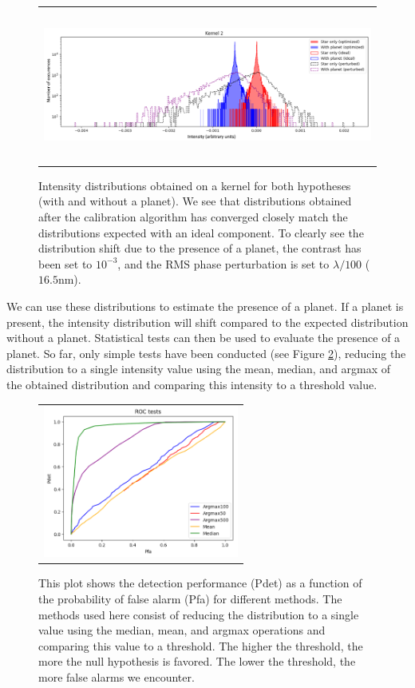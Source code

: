 \documentclass[]{spie}  %
\begin{document}
\begin{figure} [ht]
    \begin{center}
    \begin{tabular}{c}
    \includegraphics[height=5cm]{img/distrib.png}
    \end{tabular}
    \end{center}
    \caption[distrib] 
    { \label{fig:distrib} 
    Intensity distributions obtained on a kernel for both hypotheses (with and without a planet). We see that distributions obtained after the calibration algorithm has converged closely match the distributions expected with an ideal component. To clearly see the distribution shift due to the presence of a planet, the contrast has been set to $10^{-3}$, and the RMS phase perturbation is set to $\lambda / 100$ ($16.5$nm).}
\end{figure}

We can use these distributions to estimate the presence of a planet. If a planet is present, the intensity distribution will shift compared to the expected distribution without a planet. Statistical tests can then be used to evaluate the presence of a planet. So far, only simple tests have been conducted (see Figure \ref{fig:ROC}), reducing the distribution to a single intensity value using the mean, median, and argmax of the obtained distribution and comparing this intensity to a threshold value.

\begin{figure} [ht]
    \begin{center}
    \begin{tabular}{c}
    \includegraphics[height=5cm]{img/ROC.png}
    \end{tabular}
    \end{center}
    \caption[ROC] 
    { \label{fig:ROC} 
    This plot shows the detection performance (Pdet) as a function of the probability of false alarm (Pfa) for different methods. The methods used here consist of reducing the distribution to a single value using the median, mean, and argmax operations and comparing this value to a threshold. The higher the threshold, the more the null hypothesis is favored. The lower the threshold, the more false alarms we encounter.}
\end{figure}
\end{document}
